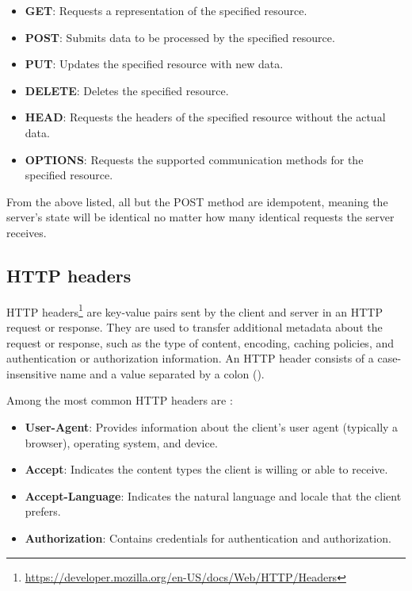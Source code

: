 \begin{itemize}
	\item \textbf{GET}: Requests a representation of the specified resource.
	\item \textbf{POST}: Submits data to be processed by the specified resource.
	\item \textbf{PUT}: Updates the specified resource with new data.
	\item \textbf{DELETE}: Deletes the specified resource.
	\item \textbf{HEAD}: Requests the headers of the specified resource without the actual data.
	\item \textbf{OPTIONS}: Requests the supported communication methods for the specified resource.
\end{itemize}

From the above listed, all but the POST method are idempotent, meaning the server's state will be identical no matter how many identical requests the server receives.

\subsection{HTTP headers}

HTTP headers\footnote{\url{https://developer.mozilla.org/en-US/docs/Web/HTTP/Headers}} are key-value pairs sent by the client and server in an HTTP request or response. They are used to transfer additional metadata about the request or response, such as the type of content, encoding, caching policies, and authentication or authorization information. An HTTP header consists of a case-insensitive name and a value separated by a colon (\uv{:}). \cite{RFC9110}

Among the most common HTTP headers are \cite{MDN}:

\begin{itemize}
	\item \textbf{User-Agent}: Provides information about the client's user agent (typically a browser), operating system, and device.
	\item \textbf{Accept}: Indicates the content types the client is willing or able to receive.
	\item \textbf{Accept-Language}: Indicates the natural language and locale that the client prefers.
	\item \textbf{Authorization}: Contains credentials for authentication and authorization.
\end{itemize}

